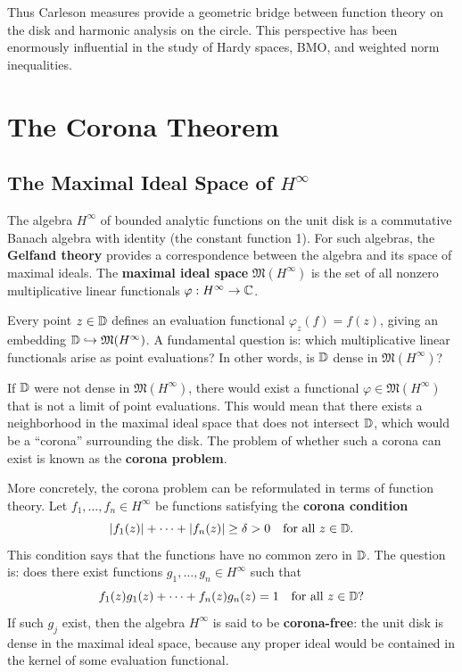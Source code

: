 Thus Carleson measures provide a geometric bridge between function theory on the disk and harmonic analysis on the circle. This perspective has been enormously influential in the study of Hardy spaces, BMO, and weighted norm inequalities.

\section{The Corona Theorem}

\subsection{The Maximal Ideal Space of \texorpdfstring{\(H^\infty\)}{H-infinity}}

The algebra \(H^\infty\) of bounded analytic functions on the unit disk is a commutative Banach algebra with identity (the constant function 1). For such algebras, the \textbf{Gelfand theory} provides a correspondence between the algebra and its space of maximal ideals. The \textbf{maximal ideal space} \(\mathfrak{M}(H^\infty)\) is the set of all nonzero multiplicative linear functionals \(\varphi: H^\infty \to \mathbb{C}\).

Every point \(z \in \mathbb{D}\) defines an evaluation functional \(\varphi_z(f) = f(z)\), giving an embedding \(\mathbb{D} \hookrightarrow \mathfrak{M}(H^\infty)\). A fundamental question is: which multiplicative linear functionals arise as point evaluations? In other words, is \(\mathbb{D}\) dense in \(\mathfrak{M}(H^\infty)\)?

If \(\mathbb{D}\) were not dense in \(\mathfrak{M}(H^\infty)\), there would exist a functional \(\varphi \in \mathfrak{M}(H^\infty)\) that is not a limit of point evaluations. This would mean that there exists a neighborhood in the maximal ideal space that does not intersect \(\mathbb{D}\), which would be a ``corona'' surrounding the disk. The problem of whether such a corona can exist is known as the \textbf{corona problem}.

More concretely, the corona problem can be reformulated in terms of function theory. Let \(f_1, \dots, f_n \in H^\infty\) be functions satisfying the \textbf{corona condition}
\[
|f_1(z)| + \cdots + |f_n(z)| \geq \delta > 0 \quad \text{for all } z \in \mathbb{D}.
\]
This condition says that the functions have no common zero in \(\mathbb{D}\). The question is: does there exist functions \(g_1, \dots, g_n \in H^\infty\) such that
\[
f_1(z) g_1(z) + \cdots + f_n(z) g_n(z) = 1 \quad \text{for all } z \in \mathbb{D}?
\]
If such \(g_j\) exist, then the algebra \(H^\infty\) is said to be \textbf{corona-free}: the unit disk is dense in the maximal ideal space, because any proper ideal would be contained in the kernel of some evaluation functional.

